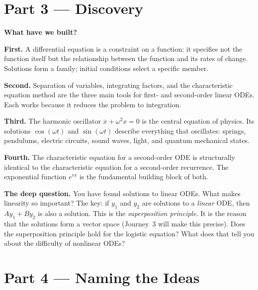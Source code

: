 \documentclass[12pt, a4paper]{article}
\newcounter{problem}
\begin{document}
\section{Part 3 \texorpdfstring{---}{--} Discovery}

\begin{discoverybox}
\textbf{What have we built?}

\textbf{First.} A differential equation is a constraint on a function: it specifies not the function itself but the relationship between the function and its rates of change. Solutions form a family; initial conditions select a specific member.

\textbf{Second.} Separation of variables, integrating factors, and the characteristic equation method are the three main tools for first- and second-order linear ODEs. Each works because it reduces the problem to integration.

\textbf{Third.} The harmonic oscillator $\ddot{x} + \omega^2 x = 0$ is the central equation of physics. Its solutions $\cos(\omega t)$ and $\sin(\omega t)$ describe everything that oscillates: springs, pendulums, electric circuits, sound waves, light, and quantum mechanical states.

\textbf{Fourth.} The characteristic equation for a second-order ODE is structurally identical to the characteristic equation for a second-order recurrence. The exponential function $e^{rx}$ is the fundamental building block of both.

\medskip
\textbf{The deep question.} You have found solutions to linear ODEs. What makes linearity so important? The key: if $y_1$ and $y_2$ are solutions to a \emph{linear} ODE, then $Ay_1 + By_2$ is also a solution. This is the \emph{superposition principle}. It is the reason that the solutions form a vector space (Journey~3 will make this precise). Does the superposition principle hold for the logistic equation? What does that tell you about the difficulty of nonlinear ODEs?
\end{discoverybox}

\section{Part 4 \texorpdfstring{---}{--} Naming the Ideas}
\end{document}

